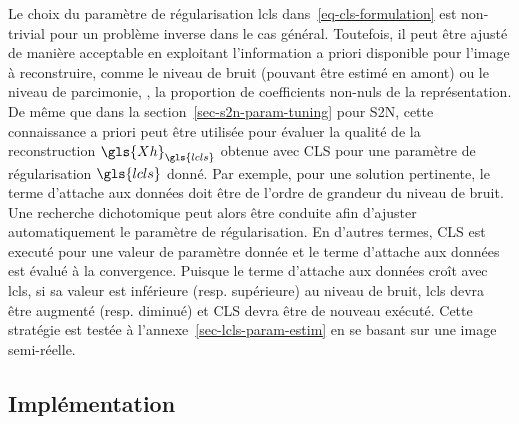 Le choix du paramètre de régularisation \gls{lcls} dans~\eqref{eq-cls-formulation} est non-trivial pour un problème inverse dans le cas général. Toutefois, il peut être ajusté de manière acceptable en exploitant l'information a priori disponible pour l'image à reconstruire, comme le niveau de bruit (pouvant être estimé en amont) ou le niveau de parcimonie, \ie{}, la proportion de coefficients non-nuls de la représentation.
%
De même que dans la section~\ref{sec-s2n-param-tuning} pour S2N, cette connaissance a priori peut être utilisée pour évaluer la qualité de la reconstruction $\gls{Xh}_{\gls{lcls}}$ obtenue avec CLS pour une paramètre de régularisation $\gls{lcls}$ donné. Par exemple, pour une solution pertinente, le terme d'attache aux données doit être de l'ordre de grandeur du niveau de bruit. Une recherche dichotomique peut alors être conduite afin d'ajuster automatiquement le paramètre de régularisation. En d'autres termes, CLS est executé pour une valeur de paramètre donnée et le terme d'attache aux données est évalué à la convergence. Puisque le terme d'attache aux données croît avec \gls{lcls}, si sa valeur est inférieure (resp. supérieure) au niveau de bruit, \gls{lcls} devra être augmenté (resp. diminué) et CLS devra être de nouveau exécuté. Cette stratégie est testée à l'annexe~\ref{sec-lcls-param-estim} en se basant sur une image semi-réelle.

\subsection{Implémentation}

